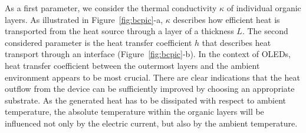 \documentclass[%
9pt,
 aip,
rsi,%
 amsmath,amssymb,
preprint,%
]{revtex4-1}
\begin{document}
As a first parameter, we consider the thermal conductivity $\kappa$ of individual organic layers. 
As illustrated in Figure~\ref{fig:bcpic}-a, $\kappa$ describes how efficient heat is transported from the heat source through a layer of a thickness $L$. 
%
The second considered parameter is the heat transfer coefficient $h$ that describes heat transport through an interface (Figure~\ref{fig:bcpic}-b).\cite{Jin2014}
In the context of OLEDs, heat transfer coefficient between the outermost layers and the ambient environment  appears to be most crucial.
There are clear indications that the heat outflow from the device can be sufficiently improved by choosing an appropriate substrate.\cite{Chung2009,Triambulo2016} 
As the generated heat has to be dissipated with respect to ambient temperature, the absolute temperature within the organic layers will be influenced not only by the electric current, but also by the ambient temperature.

\end{document}
